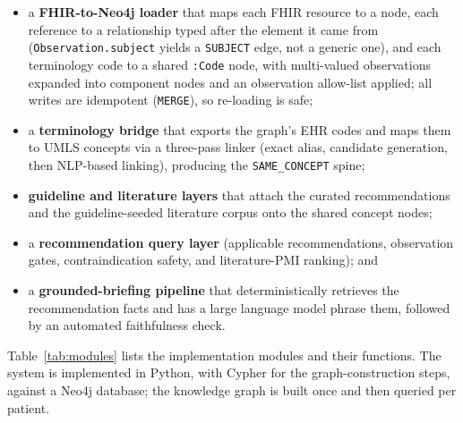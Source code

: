 \begin{itemize}
    \item a \textbf{FHIR-to-Neo4j loader} that maps each FHIR resource to a node, each
    reference to a relationship typed after the element it came from
    (\texttt{Observation.subject} yields a \texttt{SUBJECT} edge, not a generic one), and
    each terminology code to a shared \texttt{:Code}
    node, with multi-valued observations expanded into component nodes and an observation
    allow-list applied; all writes are idempotent (\texttt{MERGE}), so re-loading is safe;
    \item a \textbf{terminology bridge} that exports the graph's EHR codes and maps them to
    UMLS concepts via a three-pass linker (exact alias, candidate generation, then
    NLP-based linking), producing the \texttt{SAME\_CONCEPT} spine;
    \item \textbf{guideline and literature layers} that attach the curated recommendations
    and the guideline-seeded literature corpus onto the shared concept nodes;
    \item a \textbf{recommendation query layer} (applicable recommendations, observation
    gates, contraindication safety, and literature-PMI ranking); and
    \item a \textbf{grounded-briefing pipeline} that deterministically retrieves the
    recommendation facts and has a large language model phrase them, followed by an
    automated faithfulness check.
\end{itemize}

Table~\ref{tab:modules} lists the implementation modules and their functions. The system is
implemented in Python, with Cypher for the graph-construction steps, against a Neo4j
database; the knowledge graph is built once and then queried per patient.

